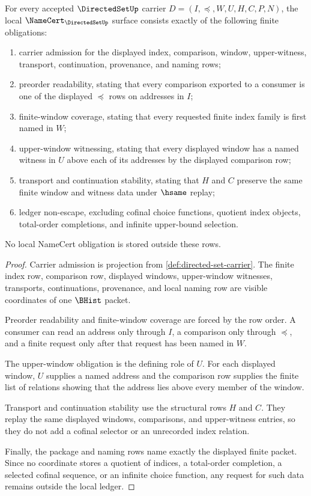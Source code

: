 \begin{theorem}
\label{thm:directed-set-namecert-obligations}
For every accepted $\DirectedSetUp$ carrier $D=(I,\preceq,W,U,H,C,P,N)$, the local $\NameCert_{\DirectedSetUp}$ surface consists exactly of the following finite obligations:
\begin{enumerate}
\item carrier admission for the displayed index, comparison, window, upper-witness, transport, continuation, provenance, and naming rows;
\item preorder readability, stating that every comparison exported to a consumer is one of the displayed $\preceq$ rows on addresses in $I$;
\item finite-window coverage, stating that every requested finite index family is first named in $W$;
\item upper-window witnessing, stating that every displayed window has a named witness in $U$ above each of its addresses by the displayed comparison row;
\item transport and continuation stability, stating that $H$ and $C$ preserve the same finite window and witness data under $\hsame$ replay;
\item ledger non-escape, excluding cofinal choice functions, quotient index objects, total-order completions, and infinite upper-bound selection.
\end{enumerate}
No local NameCert obligation is stored outside these rows.
\end{theorem}
\begin{proof}
Carrier admission is projection from \autoref{def:directed-set-carrier}. The finite index row, comparison row, displayed windows, upper-window witnesses, transports, continuations, provenance, and local naming row are visible coordinates of one $\BHist$ packet.

Preorder readability and finite-window coverage are forced by the row order. A consumer can read an address only through $I$, a comparison only through $\preceq$, and a finite request only after that request has been named in $W$.

The upper-window obligation is the defining role of $U$. For each displayed window, $U$ supplies a named address and the comparison row supplies the finite list of relations showing that the address lies above every member of the window.

Transport and continuation stability use the structural rows $H$ and $C$. They replay the same displayed windows, comparisons, and upper-witness entries, so they do not add a cofinal selector or an unrecorded index relation.

Finally, the package and naming rows name exactly the displayed finite packet. Since no coordinate stores a quotient of indices, a total-order completion, a selected cofinal sequence, or an infinite choice function, any request for such data remains outside the local ledger.
\end{proof}

